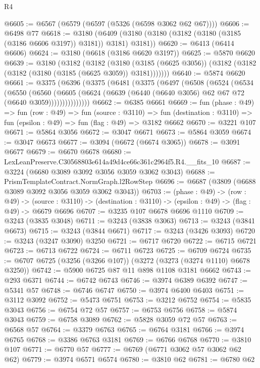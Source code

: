 \begin{lexlean}{R4}
\begin{coremodule}
@6605 := @6567 (@6579 (@6597 (@5326 (@6598 @3062 @62 @67))))
@6606 := @6498 @77
@6618 := @3180 (@6409 (@3180 (@3180 (@3182 (@3180 (@3185 (@3186 @6606 @3197)) @3181)) @3181) @3181))
@6620 := @6413 (@6414 @6606)
@6624 := @3180 (@6618 (@3186 @6620 @3197))
@6625 := @5870 @6620
@6639 := @3180
    (@3182
      (@3182
        (@3180 (@3185 (@6625 @3056)) (@3182 (@3182 (@3182 (@3180 (@3185 (@6625 @3059)) @3181)))))))
@6640 := @5874 @6620
@6661 := @3375
    (@6396
      (@3375
        (@6481
          (@3375
            (@6497
              (@6508
                (@6524
                  (@6534
                    (@6550
                      (@6560
                        (@6605
                          (@6624 (@6639 (@6440 (@6640 @3056) @62 @67 @72 (@6640 @3059)))))))))))))))
@6662 := @6385 @6661
@6669 := fun (phase : @49) =>
  fun (row : @49) =>
  fun (source : @3110) =>
  fun (destination : @3110) => fun (epsilon : @49) => fun (flag : @49) => @3182 @6662
@6670 := @3221 @107
@6671 := @5864 @3056
@6672 := @3047 @6671
@6673 := @5864 @3059
@6674 := @3047 @6673
@6677 := @3094 (@6672 (@6674 @3065))
@6678 := @3091 @6677
@6679 := @6670 @6678
@6680 := LexLeanPreserve.C30568803e614a49d4ce66c361c2964f5.R4.__fits_10
@6687 := @3224 (@6680 @3089 @3092 @3056 @3059 @3062 @3043)
@6688 := PrismTemplateContract.NormGraph.l2RowStep
@6696 := @6687 (@3809 (@6688 @3089 @3092 @3056 @3059 @3062 @3043))
@6703 := (phase : @49) ->
  (row : @49) ->
  (source : @3110) -> (destination : @3110) -> (epsilon : @49) -> (flag : @49) -> @6679 @6696
@6707 := @3235 @107 @6678 @6696 @1110
@6709 := @3243 (@3835 @3048)
@6711 := @3243 (@3838 @3063)
@6713 := @3243 (@3841 @6673)
@6715 := @3243 (@3844 @6671)
@6717 := @3243 (@3426 @3093)
@6720 := @3243 (@3247 @3090) @3250
@6721 := @6717 @6720
@6722 := @6715 @6721
@6723 := @6713 @6722
@6724 := @6711 @6723
@6725 := @6709 @6724
@6735 := @6707 @6725 (@3256 (@3266 @107)) (@3272 (@3273 (@3274 @1110) @6678 @3250))
@6742 := @5900 @6725 @87 @11 @898 @1108 @3181 @6662
@6743 := @293 @6371
@6744 := @6742 @6743
@6746 := @3974 @6389 @6392
@6747 := @5341 @57
@6748 := @6746 @6747
@6750 := @3974 @6400 @6403
@6751 := @3112 @3092
@6752 := @5473 @6751
@6753 := @3212 @6752
@6754 := @5835 @3043
@6756 := @6754 @72 @57
@6757 := @6753 @6756
@6758 := @5874 @3043
@6759 := @6758 @3089
@6762 := @5828 @3059 @72 @57
@6763 := @6568 @57
@6764 := @3379 @6763
@6765 := @6764 @3181
@6766 := @3974 @6765
@6768 := @3386 @6763 @3181
@6769 := @6766 @6768
@6770 := @3810 @107
@6771 := @6770 @57
@6777 := @6769 (@6771 @3062 @57 @3062 @62 @62)
@6779 := @3974 @6571 @6574
@6780 := @3810 @62
@6781 := @6780 @62

\end{coremodule}
\end{lexlean}
